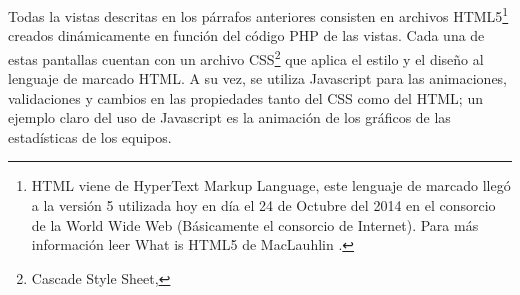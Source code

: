 		Todas la vistas descritas en los párrafos anteriores consisten en archivos HTML5\footnote{HTML viene de HyperText Markup Language, este lenguaje de marcado llegó a la versión 5 utilizada hoy en día el 24 de Octubre del 2014 en el consorcio de la World Wide Web (Básicamente el consorcio de Internet). Para más información leer What is HTML5 de MacLauhlin \cite{mclaughlin2011html5}.} creados dinámicamente en función del código PHP de las vistas. Cada una de estas pantallas cuentan con un archivo CSS\footnote{Cascade Style Sheet, } que aplica el estilo y el diseño al lenguaje de marcado HTML. A su vez, se utiliza Javascript para las animaciones, validaciones y cambios en las propiedades tanto del CSS como del HTML; un ejemplo claro del uso de Javascript es la animación de los gráficos de las estadísticas de los equipos.

